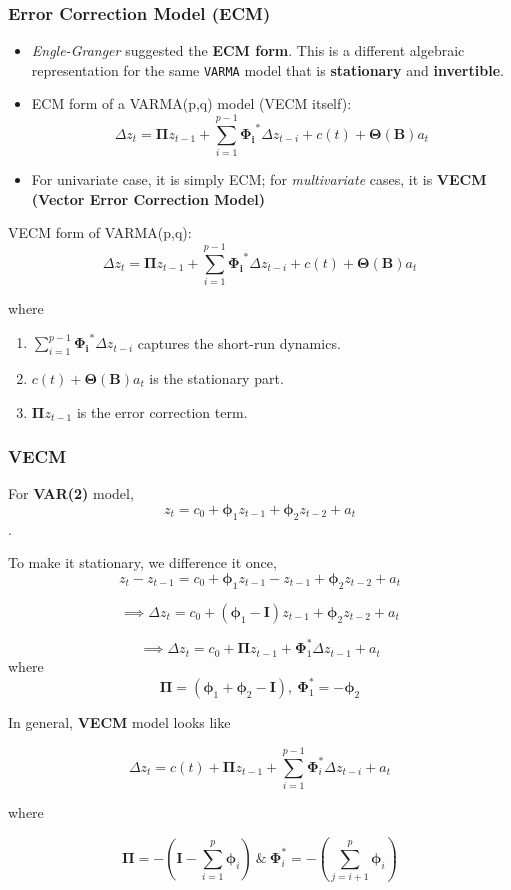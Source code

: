 \begin{frame}[allowframebreaks]
	\frametitle{Error Correction Model (ECM)}
	\begin{itemize}
		\item \textit{Engle-Granger} suggested the \textbf{ECM form}. This is a different algebraic representation for the same \texttt{VARMA} model that is \textbf{stationary} and \textbf{invertible}.
		
		\item ECM form of a VARMA(p,q) model (VECM itself):
		$$\Delta z_t = \boldsymbol{\Pi} z_{t-1} + \sum_{i=1}^{p-1} \boldsymbol{\Phi_i}^* \Delta z_{t-i} + c(t) + \boldsymbol{\Theta(B)}a_t$$
		
		\item For univariate case, it is simply ECM; for \textit{multivariate} cases, it is \textbf{VECM (Vector Error Correction Model)}
	\end{itemize}
	
	\framebreak
	
	VECM form of VARMA(p,q):
	$$\Delta z_t = \boldsymbol{\Pi} z_{t-1} + \sum_{i=1}^{p-1} \boldsymbol{\Phi_i}^* \Delta z_{t-i} + c(t) + \boldsymbol{\Theta(B)}a_t$$
	
	where 
	\begin{enumerate}
		\item $\sum_{i=1}^{p-1} \boldsymbol{\Phi_i}^* \Delta z_{t-i}$ captures the short-run dynamics.
		
		\item $c(t) + \boldsymbol{\Theta(B)}a_t$ is the stationary part.
		
		\item $\boldsymbol{\Pi} z_{t-1}$ is the error correction term.
	\end{enumerate}
\end{frame}


\begin{frame}[allowframebreaks]
	\frametitle{VECM}
	\small
	For \textbf{VAR(2)} model,
	$$z_t = c_0 + \boldsymbol{\phi}_1 z_{t-1} + \boldsymbol{\phi}_2 z_{t-2} + a_t$$.
	
	To make it stationary, we difference it once,
	$$z_t  - z_{t-1} = c_0 + \boldsymbol{\phi}_1 z_{t-1} - z_{t-1} + \boldsymbol{\phi}_2 z_{t-2} + a_t$$
	
	$$\implies \Delta z_t = c_0 + (\boldsymbol{\phi}_1 - \boldsymbol{I})z_{t-1} + \boldsymbol{\phi}_2 z_{t-2} + a_t$$
	
	$$\implies \Delta z_t = c_0 + \boldsymbol{\Pi} z_{t-1} + \boldsymbol{\Phi}_1^* \Delta z_{t-1} + a_t$$
	where
	$$\boldsymbol{\Pi} = (\boldsymbol{\phi}_1 + \boldsymbol{\phi}_2 - \boldsymbol{I}),\ \boldsymbol{\Phi}_1^* = \boldsymbol{-\phi}_2$$
	
	\framebreak
	
	In general, \textbf{VECM} model looks like
	
	$$\Delta z_t = c(t) + \boldsymbol{\Pi} z_{t-1} + \sum_{i=1}^{p-1} \boldsymbol{\Phi}_i^* \Delta z_{t-i} + a_t$$
	
	where
	
	$$\boldsymbol{\Pi} = -(\boldsymbol{I} - \sum_{i=1}^{p} \boldsymbol{\phi}_i)\ \&\ \boldsymbol{\Phi}_i^* = -(\sum_{j=i+1}^{p}\boldsymbol{\phi}_i)$$
\end{frame}